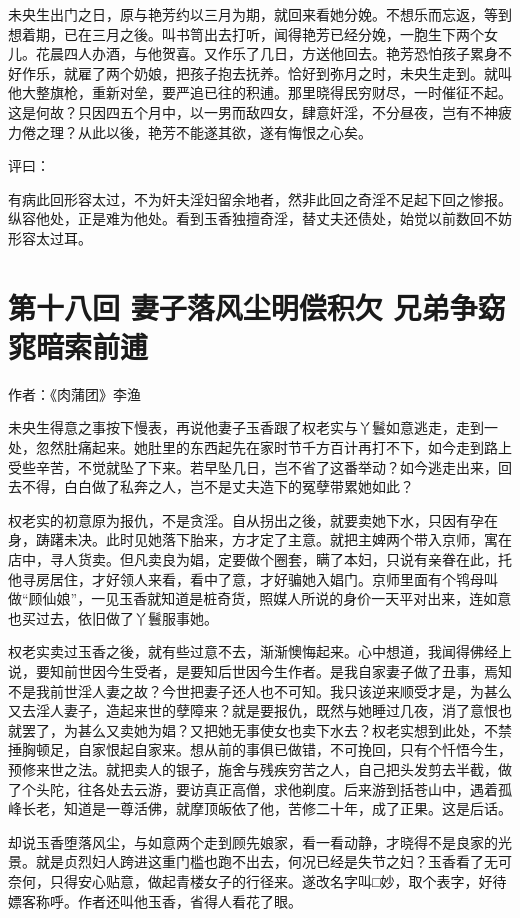 \documentclass[a4paper,12pt,UTF8,twoside]{ctexbook}
\begin{document}
未央生出门之日，原与艳芳约以三月为期，就回来看她分娩。不想乐而忘返，等到想着期，已在三月之後。叫书笥出去打听，闻得艳芳已经分娩，一胞生下两个女儿。花晨四人办酒，与他贺喜。又作乐了几日，方送他回去。艳芳恐怕孩子累身不好作乐，就雇了两个奶娘，把孩子抱去抚养。恰好到弥月之时，未央生走到。就叫他大整旗枪，重新对垒，要严追已往的积逋。那里晓得民穷财尽，一时催征不起。这是何故？只因四五个月中，以一男而敌四女，肆意奸淫，不分昼夜，岂有不神疲力倦之理？从此以後，艳芳不能遂其欲，遂有悔恨之心矣。

评曰：

有病此回形容太过，不为奸夫淫妇留余地者，然非此回之奇淫不足起下回之惨报。纵容他处，正是难为他处。看到玉香独擅奇淫，替丈夫还债处，始觉以前数回不妨形容太过耳。

\chapter{第十八回 妻子落风尘明偿积欠 兄弟争窈窕暗索前逋}

作者：《肉蒲团》李渔

未央生得意之事按下慢表，再说他妻子玉香跟了权老实与丫鬟如意逃走，走到一处，忽然肚痛起来。她肚里的东西起先在家时节千方百计再打不下，如今走到路上受些辛苦，不觉就坠了下来。若早坠几日，岂不省了这番举动？如今逃走出来，回去不得，白白做了私奔之人，岂不是丈夫造下的冤孽带累她如此？

权老实的初意原为报仇，不是贪淫。自从拐出之後，就要卖她下水，只因有孕在身，踌躇未决。此时见她落下胎来，方才定了主意。就把主婢两个带入京师，寓在店中，寻人货卖。但凡卖良为娼，定要做个圈套，瞒了本妇，只说有亲眷在此，托他寻房居住，才好领人来看，看中了意，才好骗她入娼门。京师里面有个鸨母叫做“顾仙娘”，一见玉香就知道是桩奇货，照媒人所说的身价一天平对出来，连如意也买过去，依旧做了丫鬟服事她。

权老实卖过玉香之後，就有些过意不去，渐渐懊悔起来。心中想道，我闻得佛经上说，要知前世因今生受者，是要知后世因今生作者。是我自家妻子做了丑事，焉知不是我前世淫人妻之故？今世把妻子还人也不可知。我只该逆来顺受才是，为甚么又去淫人妻子，造起来世的孽障来？就是要报仇，既然与她睡过几夜，消了意恨也就罢了，为甚么又卖她为娼？又把她无事使女也卖下水去？权老实想到此处，不禁捶胸顿足，自家恨起自家来。想从前的事俱已做错，不可挽回，只有个忏悟今生，预修来世之法。就把卖人的银子，施舍与残疾穷苦之人，自己把头发剪去半截，做了个头陀，往各处去云游，要访真正高僧，求他剃度。后来游到括苍山中，遇着孤峰长老，知道是一尊活佛，就摩顶皈依了他，苦修二十年，成了正果。这是后话。

却说玉香堕落风尘，与如意两个走到顾先娘家，看一看动静，才晓得不是良家的光景。就是贞烈妇人跨进这重门槛也跑不出去，何况已经是失节之妇？玉香看了无可奈何，只得安心贴意，做起青楼女子的行径来。遂改名字叫□妙，取个表字，好待嫖客称呼。作者还叫他玉香，省得人看花了眼。
\end{document}
